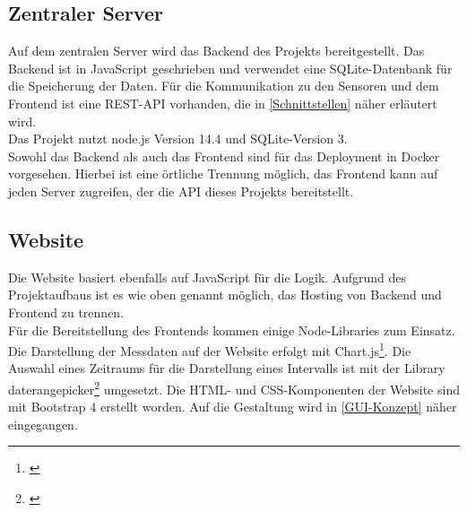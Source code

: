 \subsection{Zentraler Server}%
Auf dem zentralen Server wird das Backend des Projekts bereitgestellt. Das Backend ist in JavaScript geschrieben und verwendet eine SQLite-Datenbank für die Speicherung der Daten. Für die Kommunikation zu den Sensoren und dem Frontend ist eine REST-API vorhanden, die in \autoref{Schnittstellen} näher erläutert wird.\\
Das Projekt nutzt node.js Version 14.4 und SQLite-Version 3.\\
Sowohl das Backend als auch das Frontend sind für das Deployment in Docker vorgesehen. Hierbei ist eine örtliche Trennung möglich, das Frontend kann auf jeden Server zugreifen, der die API dieses Projekts bereitstellt.

\subsection{Website}
Die Website basiert ebenfalls auf JavaScript für die Logik. Aufgrund des Projektaufbaus ist es wie oben genannt möglich, das Hosting von Backend und Frontend zu trennen.\\
Für die Bereitstellung des Frontends kommen einige Node-Libraries zum Einsatz. Die Darstellung der Messdaten auf der Website erfolgt mit Chart.js\footnote{\cite{chartjs.2020}}. Die Auswahl eines Zeitraums für die Darstellung eines Intervalls ist mit der Library daterangepicker\footnote{\cite{daterangepicker.2020}} umgesetzt.
Die HTML- und CSS-Komponenten der Website sind mit Bootstrap 4 erstellt worden. Auf die Gestaltung wird in \autoref{GUI-Konzept} näher eingegangen.